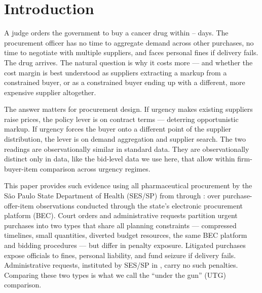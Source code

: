 
\section{Introduction}
\label{sec:introduction}

A judge orders the government to buy a cancer drug within
\BPurgentPlanLow--\BPurgentPlanHigh{} days. The procurement officer has no
time to aggregate demand across other purchases, no time to negotiate with
multiple suppliers, and faces personal fines if delivery fails. The drug
arrives. The natural question is why it costs more --- and whether the
cost margin is best understood as suppliers extracting a markup from a
constrained buyer, or as a constrained buyer ending up with a different,
more expensive supplier altogether.

The answer matters for procurement design. If urgency makes existing
suppliers raise prices, the policy lever is on contract terms ---
deterring opportunistic markup. If urgency forces the buyer onto a
different point of the supplier distribution, the lever is on demand
aggregation and supplier search. The two readings are observationally
similar in standard data. They are observationally distinct only in
data, like the bid-level data we use here, that allow within firm-buyer-item
comparison across urgency regimes.

This paper provides such evidence using all pharmaceutical procurement by
the S\~ao Paulo State Department of Health (SES/SP) from
\BPsampleStartYear{} through \BPsampleEndYear: over \BPnPOIfull{}
purchase-offer-item observations conducted through the state's electronic
procurement platform (BEC). Court orders and administrative requests
partition urgent purchases into two types that share all planning
constraints --- compressed timelines, small quantities, diverted budget
resources, the same BEC platform and bidding procedures --- but differ in
penalty exposure. Litigated purchases expose officials to fines, personal
liability, and fund seizure if delivery fails. Administrative requests,
instituted by SES/SP in \BPsampleStartYear, carry no such penalties.
Comparing these two types is what we call the ``under the gun'' (UTG)
comparison.

